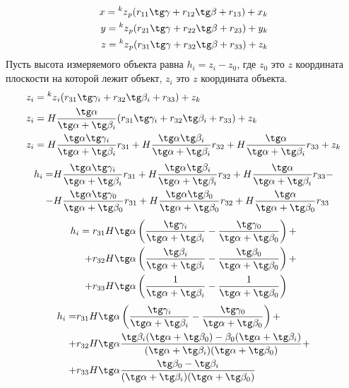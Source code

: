 \documentclass[a4paper, 12pt]{article}
\begin{document}
    \[
        \begin{split}
            x = \prescript{k}{}{z}_p(r_{11}\tg\gamma + r_{12}\tg\beta + r_{13}) + x_k\\
            y = \prescript{k}{}{z}_p(r_{21}\tg\gamma + r_{22}\tg\beta + r_{23}) + y_k\\
            z = \prescript{k}{}{z}_p(r_{31}\tg\gamma + r_{32}\tg\beta + r_{33}) + z_k\\
        \end{split}
    \]
    Пусть высота измеряемого объекта равна $h_i = z_i - z_0$, где $z_0$ это $z$ координата плоскости на которой лежит объект, $z_i$ это $z$ координата объекта.
    \[
        \begin{split}
            z_i &= \prescript{k}{}{z}_i(r_{31}\tg\gamma_i + r_{32}\tg\beta_i + r_{33}) + z_k\\
            z_i &= H\frac{\tg\alpha}{\tg\alpha+\tg\beta_i}(r_{31}\tg\gamma_i + r_{32}\tg\beta_i + r_{33}) + z_k\\
            z_i &= H\frac{\tg\alpha\tg\gamma_i}{\tg\alpha+\tg\beta_i}r_{31} + H\frac{\tg\alpha\tg\beta_i}{\tg\alpha+\tg\beta_i}r_{32} + H\frac{\tg\alpha}{\tg\alpha+\tg\beta_i}r_{33} + z_k
        \end{split}
    \]
    \[
        \begin{split}
            h_i = &H\frac{\tg\alpha\tg\gamma_i}{\tg\alpha+\tg\beta_i}r_{31} + H\frac{\tg\alpha\tg\beta_i}{\tg\alpha+\tg\beta_i}r_{32} + H\frac{\tg\alpha}{\tg\alpha+\tg\beta_i}r_{33}-\\
            - &H\frac{\tg\alpha\tg\gamma_0}{\tg\alpha+\tg\beta_0}r_{31} + H\frac{\tg\alpha\tg\beta_0}{\tg\alpha+\tg\beta_0}r_{32} + H\frac{\tg\alpha}{\tg\alpha+\tg\beta_0}r_{33}
        \end{split}
    \]
    \[
        \begin{aligned}
            h_i = r_{31} H \tg\alpha &\left(\frac{\tg\gamma_i}{\tg\alpha+\tg\beta_i} - \frac{\tg\gamma_0}{\tg\alpha+\tg\beta_0}\right)+\\
            + r_{32} H \tg\alpha &\left(\frac{\tg\beta_i}{\tg\alpha+\tg\beta_i} - \frac{\tg\beta_0}{\tg\alpha+\tg\beta_0}\right)+\\
            + r_{33} H \tg\alpha &\left(\frac{1}{\tg\alpha+\tg\beta_i} - \frac{1}{\tg\alpha+\tg\beta_0}\right)
        \end{aligned}
    \]
    \[
        \begin{aligned}
            h_i = &r_{31} H \tg\alpha \left(\frac{\tg\gamma_i}{\tg\alpha+\tg\beta_i} - \frac{\tg\gamma_0}{\tg\alpha+\tg\beta_0}\right)+\\
            + &r_{32} H \tg\alpha \frac{\tg\beta_i(\tg\alpha+\tg\beta_0)-\beta_0(\tg\alpha+\tg\beta_i)}{(\tg\alpha+\tg\beta_i)(\tg\alpha+\tg\beta_0)}+\\
            + &r_{33} H \tg\alpha \frac{\tg\beta_0 - \tg\beta_i}{(\tg\alpha+\tg\beta_i)(\tg\alpha+\tg\beta_0)}
        \end{aligned}
    \]
\end{document}
